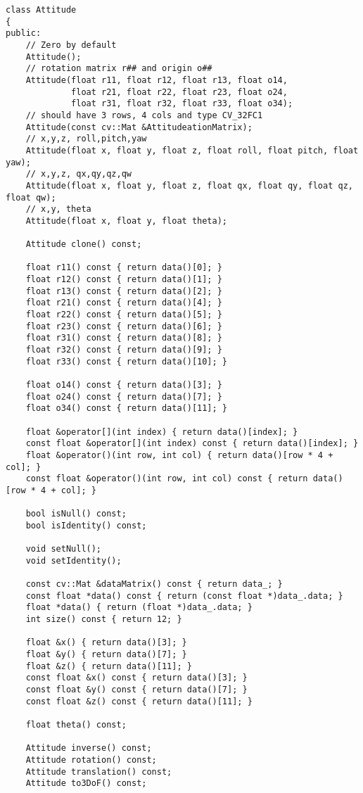 \documentclass[UTF8]{ctexart}
\begin{document}
\begin{lstlisting}[caption={}]
class Attitude
{
public:
    // Zero by default
    Attitude();
    // rotation matrix r## and origin o##
    Attitude(float r11, float r12, float r13, float o14,
             float r21, float r22, float r23, float o24,
             float r31, float r32, float r33, float o34);
    // should have 3 rows, 4 cols and type CV_32FC1
    Attitude(const cv::Mat &AttitudeationMatrix);
    // x,y,z, roll,pitch,yaw
    Attitude(float x, float y, float z, float roll, float pitch, float yaw);
    // x,y,z, qx,qy,qz,qw
    Attitude(float x, float y, float z, float qx, float qy, float qz, float qw);
    // x,y, theta
    Attitude(float x, float y, float theta);

    Attitude clone() const;

    float r11() const { return data()[0]; }
    float r12() const { return data()[1]; }
    float r13() const { return data()[2]; }
    float r21() const { return data()[4]; }
    float r22() const { return data()[5]; }
    float r23() const { return data()[6]; }
    float r31() const { return data()[8]; }
    float r32() const { return data()[9]; }
    float r33() const { return data()[10]; }

    float o14() const { return data()[3]; }
    float o24() const { return data()[7]; }
    float o34() const { return data()[11]; }

    float &operator[](int index) { return data()[index]; }
    const float &operator[](int index) const { return data()[index]; }
    float &operator()(int row, int col) { return data()[row * 4 + col]; }
    const float &operator()(int row, int col) const { return data()[row * 4 + col]; }

    bool isNull() const;
    bool isIdentity() const;

    void setNull();
    void setIdentity();

    const cv::Mat &dataMatrix() const { return data_; }
    const float *data() const { return (const float *)data_.data; }
    float *data() { return (float *)data_.data; }
    int size() const { return 12; }

    float &x() { return data()[3]; }
    float &y() { return data()[7]; }
    float &z() { return data()[11]; }
    const float &x() const { return data()[3]; }
    const float &y() const { return data()[7]; }
    const float &z() const { return data()[11]; }

    float theta() const;

    Attitude inverse() const;
    Attitude rotation() const;
    Attitude translation() const;
    Attitude to3DoF() const;


\end{lstlisting}
\end{document}
